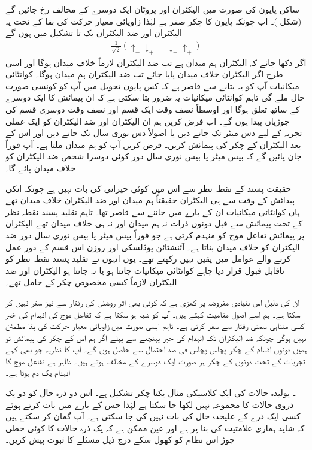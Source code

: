 ساکن پایون کی صورت میں الیکٹران اور پروٹان ایک دوسرے کے مخالف رخ جائیں گے (شکل )۔ اب چونکہ پایون کا چکر صفر ہے لہٰذا زاویائی معیار حرکت کی بقا کے تحت یہ الیکٹران اور ضد الیکٹران  یک تا تشکیل  میں ہوں گے
\begin{align}
	\frac{1}{\sqrt{2}}(\uparrow_{-}\downarrow_{+}-\downarrow_{-}\uparrow_{+})
\end{align}
اگر دکھا جائے کہ الیکٹران ہم میدان ہے تب ضد الیکٹران لازماً خلاف میدان ہوگا اور اسی طرح اگر الیکٹران خلاف میدان پایا جائے تب ضد الیکٹران ہم میدان ہوگا۔ کوانٹائی میکانیات آپ کو یہ بتانے سے قاصر ہے کہ کس پایون تحویل میں آپ کو کونسی صورت حال ملے گی تاہم کوانٹائی میکانیات یہ ضرور بتا سکتی ہے کہ ان پیمائش کا ایک دوسرے کے ساتھ تعلق ہوگا اور اوسطاً نصف وقت ایک قسم اور نصف وقت دوسری قسم کی جوڑیاں پیدا ہوں گے۔ اب فرض کریں ہم ان الیکٹران اور ضد الیکٹران کو ایک عملی تجربہ کے لیے دس میٹر تک جانے دیں یا اصولاً دس نوری سال تک جانے دیں اور اس کے بعد الیکٹران کے چکر کی پیمائش کریں۔ فرض کریں آپ کو ہم میدان ملتا ہے۔ آپ فوراً جان پائیں گے کہ بیس میٹر یا بیس نوری سال دور کوئی دوسرا شخص ضد الیکٹران کو خلاف میدان پائے گا۔

حقیقت پسند کے نقطہ نظر سے اس میں کوئی حیرانی کی بات نہیں ہے چونکہ انکی پیدائش کے وقت سے ہی الیکٹران حقیقتاً ہم میدان اور ضد الیکٹران خلاف میدان تھے ہاں کوانٹائی میکانیات ان کے بارے میں جاننے سے قاصر تھا۔ تاہم تقلید پسند نقطہ نظر کے تحت پیمائش سے قبل دونوں ذرات نہ ہم میدان اور نہ ہی خلاف میدان تھے الیکٹران پر پیمائش تفاعل موج کو منہدم کرتی ہے جو فوراً بیس میٹر یا بیس نوری سال دور ضد الیکٹران کو خلاف میدان بناتا ہے۔ آئنشٹائن پوڈلسکی اور روزن اس قسم کے دور عمل کرنے والے عوامل میں یقین نہیں رکھتے تھے۔ یوں انہوں نے تقلید پسند نقطہ نظر کو ناقابل قبول قرار دیا چاہے کوانٹائی میکانیات جانتا ہو یا نہ جانتا ہو الیکٹران اور ضد الیکٹران لازماً کسی مخصوص چکر کے حامل تھے۔

ان کی دلیل اس بنیادی مفروضہ پر کھڑی ہے کہ کوئی بھی  اثر روشنی کی رفتار سے تیز سفر نہیں کر سکتا ہے۔ ہم اسے اصول مقامیت کہتے ہیں۔ آپ کو شبہ ہو سکتا ہے کہ تفاعل موج کی انہدام کی خبر کسی متناہی سمتی رفتار سے سفر کرتی ہے۔ تاہم ایسی صورت میں زاویائی معیار حرکت کی بقا مطمئن نہیں ہوگی چونکہ ضد الیکٹران تک انہدام کی خبر پہنچنے سے پہلے اگر ہم اس کے چکر کی پیمائش تو ہمیں دونوں اقسام کے چکر پچاس پچاس فی صد احتمال سے حاصل ہوں گے۔ آپ کا نظریہ جو بھی کہے تجربات کے تحت دونوں کے چکر ہر صورت ایک دوسرے کے  مخالف  ہوتے ہیں۔ ظاہر ہے تفاعل موج کا انہدام یک دم ہوتا ہے۔

۔ یولیدہ حالات کی ایک کلاسیکی مثال یکتا چکر تشکیل   ہے۔ اس دو ذرہ حال کو دو یک ذروی حالات کا مجموعہ نہیں لکھا جا سکتا ہے لہٰذا جس کے بارے میں بات کرتے ہوئے کسی ایک ذرے کے علیحدہ حال کی بات نہیں کی جا سکتی ہے۔ آپ گمان کر سکتے ہیں کہ شاید  ہماری علامتیت کی بنا پر ہے اور عین ممکن ہے کہ یک ذرہ حالات کا کوئی خطی جوڑ اس نظام کو کھول سکے درج ذیل مسئلے کا ثبوت پیش کریں۔

